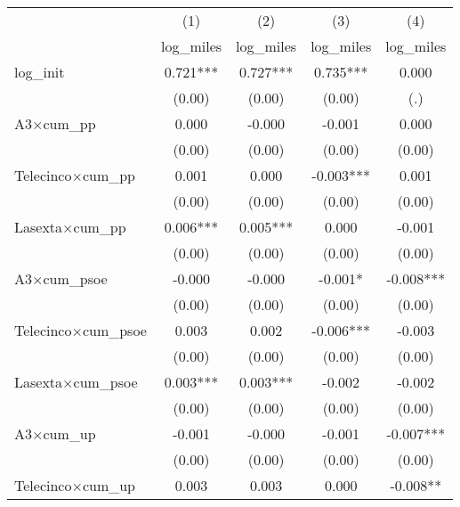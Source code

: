 \begin{tabular}{l*{4}{c}}
\toprule
                    &\multicolumn{1}{c}{(1)}&\multicolumn{1}{c}{(2)}&\multicolumn{1}{c}{(3)}&\multicolumn{1}{c}{(4)}\\
                    &\multicolumn{1}{c}{log\_miles}&\multicolumn{1}{c}{log\_miles}&\multicolumn{1}{c}{log\_miles}&\multicolumn{1}{c}{log\_miles}\\
\midrule
log\_init            &       0.721***&       0.727***&       0.735***&       0.000   \\
                    &      (0.00)   &      (0.00)   &      (0.00)   &         (.)   \\
A3$\times$cum\_pp    &       0.000   &      -0.000   &      -0.001   &       0.000   \\
                    &      (0.00)   &      (0.00)   &      (0.00)   &      (0.00)   \\
Telecinco$\times$cum\_pp&       0.001   &       0.000   &      -0.003***&       0.001   \\
                    &      (0.00)   &      (0.00)   &      (0.00)   &      (0.00)   \\
Lasexta$\times$cum\_pp&       0.006***&       0.005***&       0.000   &      -0.001   \\
                    &      (0.00)   &      (0.00)   &      (0.00)   &      (0.00)   \\
A3$\times$cum\_psoe  &      -0.000   &      -0.000   &      -0.001*  &      -0.008***\\
                    &      (0.00)   &      (0.00)   &      (0.00)   &      (0.00)   \\
Telecinco$\times$cum\_psoe&       0.003   &       0.002   &      -0.006***&      -0.003   \\
                    &      (0.00)   &      (0.00)   &      (0.00)   &      (0.00)   \\
Lasexta$\times$cum\_psoe&       0.003***&       0.003***&      -0.002   &      -0.002   \\
                    &      (0.00)   &      (0.00)   &      (0.00)   &      (0.00)   \\
A3$\times$cum\_up    &      -0.001   &      -0.000   &      -0.001   &      -0.007***\\
                    &      (0.00)   &      (0.00)   &      (0.00)   &      (0.00)   \\
Telecinco$\times$cum\_up&       0.003   &       0.003   &       0.000   &      -0.008** \\

\end{tabular}
